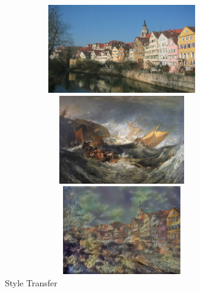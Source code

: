 \documentclass{article}
\begin{document}
\begin{figure}[ht]
\centering
\caption{Style Transfer}
\label{fig:style-transfer}

    \begin{minipage}{0.45\linewidth}
    \centering
    \includegraphics[width=0.9\textwidth,height=1.5in]{img/content/tubingen}
    \end{minipage}

\medskip

    \begin{minipage}{0.45\linewidth}
    \centering
    \includegraphics[width=0.9\textwidth,height=1.5in]{img/artworks/the-shipwreck-of-the-minotaur}
    \end{minipage}
    \begin{minipage}{0.45\linewidth}
    \centering
    \includegraphics[width=0.9\textwidth,height=1.5in]{img/transfer/the-shipwreck-of-the-minotaur}
    \end{minipage}

\medskip


\end{figure}
\end{document}
